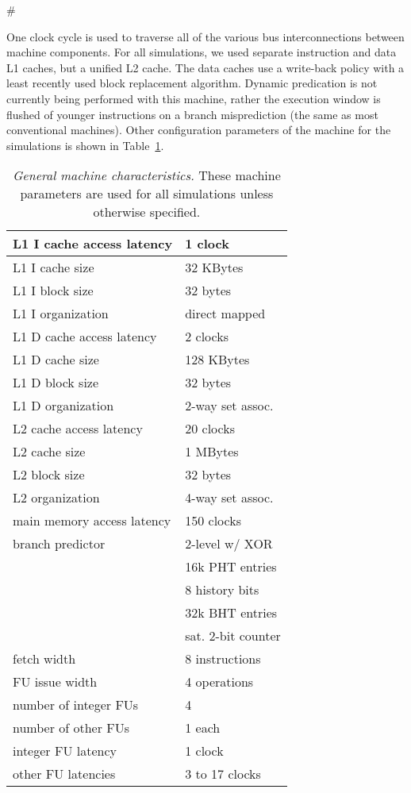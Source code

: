 #\documentclass[10pt,dvips]{article}
\begin{document}
One clock cycle is used to traverse all of the
various bus interconnections between machine components.
For all simulations, we used separate instruction and
data L1 caches, but a unified L2 cache.
The data caches use a write-back policy with a least recently used
block replacement algorithm.
Dynamic predication is not
currently being performed with this machine, rather
the execution window is flushed of younger instructions
on a branch misprediction (the same as most conventional machines).
Other configuration parameters of the machine for the
simulations is shown in Table~\ref{tab:baseline}.

%
\begin{table}
\begin{center}
\caption{{\em General machine characteristics.}
These machine parameters are used for all simulations
unless otherwise specified.}
\label{tab:baseline}
\scriptsize{
\begin{tabular}{|l|l|}
\hline 
L1 I cache access latency&1 clock\\
\hline
L1 I cache size&32 KBytes\\
\hline
L1 I block size&32 bytes\\
\hline
L1 I organization&direct mapped\\
%
\hline 
L1 D cache access latency&2 clocks\\
\hline
L1 D cache size&128 KBytes\\
\hline
L1 D block size&32 bytes\\
\hline
L1 D organization&2-way set assoc.\\
%
\hline
L2 cache access latency&20 clocks\\
\hline
L2 cache size&1 MBytes\\
\hline
L2 block size&32 bytes\\
\hline
L2 organization&4-way set assoc.\\
%
\hline
main memory access latency&150 clocks\\
\hline
branch predictor&2-level w/ XOR\\
\cline{2-2}
 & 16k PHT entries\\
\cline{2-2}
 & 8 history bits\\
\cline{2-2}
 & 32k BHT entries\\
\cline{2-2}
 & sat. 2-bit counter\\
\hline
fetch width & 8 instructions \\
\hline
FU issue width & 4 operations \\
\hline
number of integer FUs & 4 \\
\hline
number of other FUs & 1 each \\
\hline
integer FU latency & 1 clock \\
\hline
other FU latencies & 3 to 17 clocks \\
\hline 
\end{tabular}
}
\end{center}
\end{table}
%
\end{document}
